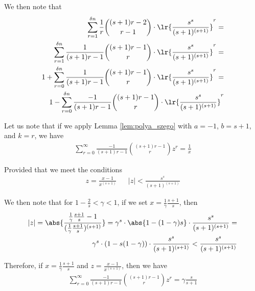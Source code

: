 \documentclass[../main.tex]{subfiles}
\begin{document}
    We then note that
    \begin{equation}\begin{split}
        \sum_{r=1}^{\delta n} \frac{1}{r} {(s+1)r-2 \choose r-1} \cdot \lr{\frac{s^s}{(s+1)^{(s+1)}}}^{r} = \\
        \sum_{r=1}^{\delta n} \frac{1}{(s+1)r-1} {(s+1)r-1 \choose r} \cdot \lr{\frac{s^s}{(s+1)^{(s+1)}}}^{r} = \\
        1 + \sum_{r=0}^{\delta n} \frac{1}{(s+1)r-1} {(s+1)r-1 \choose r} \cdot \lr{\frac{s^s}{(s+1)^{(s+1)}}}^{r} = \\
        1 - \sum_{r=0}^{\delta n} \frac{-1}{(s+1)r-1} {(s+1)r-1 \choose r} \cdot \lr{\frac{s^s}{(s+1)^{(s+1)}}}^{r}
    \end{split}\end{equation}
    
    Let us note that if we apply Lemma \ref{lem:polya_szego} with $a = -1$, $b = s+1$, and $k = r$, we have
    \begin{equation}\begin{split}
        \sum_{r=0}^{\infty} \frac{-1}{(s+1)r-1} {(s+1)r - 1 \choose r} z^r = \frac{1}{x}
    \end{split}\end{equation}

    Provided that we meet the conditions
    \begin{align}
        z = \frac{x - 1}{x^{(s+1)}} && |z| < \frac{s^s}{(s+1)^{(s+1)}}
    \end{align}
    
    We then note that for $1 - \frac{2}{s} < \gamma < 1$, if we set $x = \frac{1}{\gamma} \frac{s+1}{s}$, then
    \begin{equation}\begin{split}
        |z| = \abs{\frac{\frac{1}{\gamma} \frac{s+1}{s} - 1}{(\frac{1}{\gamma} \frac{s+1}{s})^{(s+1)}}} = \gamma^{s} \cdot \abs{1 - (1 - \gamma)s} \cdot \frac{s^s}{(s+1)^{(s+1)}} = \\ \gamma^s \cdot (1 - s (1 - \gamma)) \cdot \frac{s^s}{(s+1)^{(s+1)}} < \frac{s^s}{(s+1)^{(s+1)}}
    \end{split}\end{equation}
    
    Therefore, if $x = \frac{1}{\gamma} \frac{s+1}{s}$ and $z = \frac{x - 1}{x^{(s+1)}}$, then we have
    \begin{equation}\begin{split}
        \sum_{r=0}^{\infty} \frac{-1}{(s+1)r-1} {(s+1)r - 1 \choose r} z^r = \gamma \frac{s}{s+1}
    \end{split}\end{equation}
\end{document}
